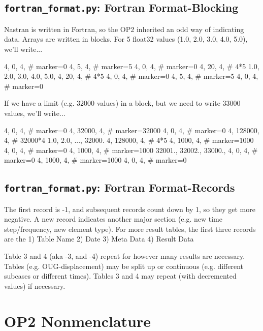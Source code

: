  \subsection{{\tt fortran_format.py}: Fortran Format-Blocking}
     Nastran is written in Fortran, so the OP2 inherited an odd way of indicating data.  Arrays are written in blocks.  For 5 float32 values (1.0, 2.0, 3.0, 4.0, 5.0), we'll write...
     
         4, 0, 4,  # marker=0
         4, 5, 4,  # marker=5
         4, 0, 4,  # marker=0
         4, 20, 4, # 4*5
         1.0, 2.0, 3.0, 4.0, 5.0,
         4, 20, 4, # 4*5
         4, 0, 4,  # marker=0
         4, 5, 4,  # marker=5
         4, 0, 4,  # marker=0
     
     If we have a limit (e.g. 32000 values) in a block, but we need to write 33000 values, we'll write...
     
         4, 0, 4,      # marker=0
         4, 32000, 4,  # marker=32000
         4, 0, 4,      # marker=0
         4, 128000, 4, # 32000*4
         1.0, 2.0, ..., 32000.
         4, 128000, 4, # 4*5
         4, 1000, 4,   # marker=1000
         4, 0, 4,      # marker=0
         4, 1000, 4,   # marker=1000
         32001., 32002., 33000.,
         4, 0, 4,    # marker=0
         4, 1000, 4, # marker=1000
         4, 0, 4,    # marker=0
         
 \subsection{{\tt fortran_format.py}: Fortran Format-Records}
     The first record is -1, and subsequent records count down by 1, so they get more negative.  A new record indicates another major section (e.g. new time step/frequency, new element type).  For more result tables, the first three records are the
       1) Table Name
       2) Date
       3) Meta Data
       4) Result Data
     
     Table 3 and 4 (aka -3, and -4) repeat for however many results are necessary.  Tables (e.g. OUG-displacement) may be split up or continuous (e.g. different subcases or different times).  Tables 3 and 4 may repeat (with decremented values) if necessary.
     
\section{OP2 Nonmenclature}

